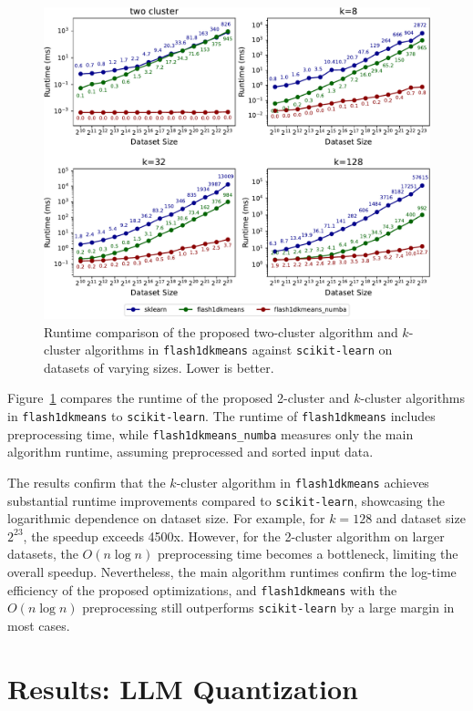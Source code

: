 \begin{figure}[H]
    \includegraphics[width=\textwidth]{figures/runtime_comparison.pdf}
    \caption{Runtime comparison of the proposed two-cluster algorithm and $k$-cluster algorithms in \texttt{flash1dkmeans} against \texttt{scikit-learn} on datasets of varying sizes. Lower is better.}
    \label{fig:runtime_comparison}
\end{figure}

Figure~\ref{fig:runtime_comparison} compares the runtime of the proposed 2-cluster and $k$-cluster algorithms in \texttt{flash1dkmeans} to \texttt{scikit-learn}. The runtime of \texttt{flash1dkmeans} includes preprocessing time, while \texttt{flash1dkmeans\_numba} measures only the main algorithm runtime, assuming preprocessed and sorted input data. 

The results confirm that the $k$-cluster algorithm in \texttt{flash1dkmeans} achieves substantial runtime improvements compared to \texttt{scikit-learn}, showcasing the logarithmic dependence on dataset size. For example, for \(k=128\) and dataset size \(2^{23}\), the speedup exceeds 4500x. However, for the 2-cluster algorithm on larger datasets, the \(O(n \log n)\) preprocessing time becomes a bottleneck, limiting the overall speedup. Nevertheless, the main algorithm runtimes confirm the log-time efficiency of the proposed optimizations, and \texttt{flash1dkmeans} with the $O(n \log n)$ preprocessing still outperforms \texttt{scikit-learn} by a large margin in most cases.

\section{Results: LLM Quantization}\label{sec:llm_quantization}

